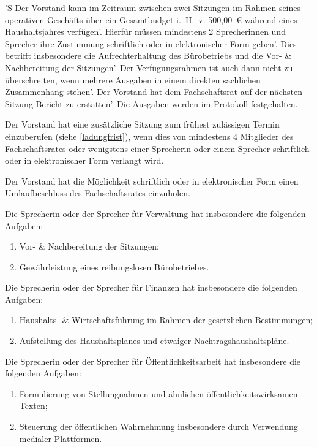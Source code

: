\documentclass[%
	parskip=half,
]{scrartcl}
\newcommand{\edit}[1]{{\color{red} #1}}
\newcommand{\add}[1]{{\color{blue} #1}}
\begin{document}
\begin{contract}
'S \edit{Der Vorstand kann} im Zeitraum zwischen zwei Sitzungen im Rahmen \edit{seines} operativen Geschäfts
über ein Gesamtbudget i.~H.~v. \edit{500,00}~€ \add{während eines Haushaltsjahres} verfügen'. Hierfür müssen mindestens
2 \edit{Sprecherinnen und Sprecher} ihre Zustimmung schriftlich oder in elektronischer Form geben'. Dies betrifft
insbesondere die Aufrechterhaltung des Bürobetriebs und die Vor- \& Nachbereitung der Sitzungen'. Der Verfügungsrahmen
ist auch dann nicht zu überschreiten, wenn mehrere Ausgaben in einem direkten sachlichen Zusammenhang stehen'. 
\edit{Der Vorstand hat} dem Fachschaftsrat auf der nächsten Sitzung Bericht zu erstatten'. Die Ausgaben
werden im Protokoll festgehalten.

\edit{Der Vorstand hat} eine zusätzliche Sitzung zum frühest zulässigen Termin einzuberufen \add{(siehe 
\ref{ladungfrist})}, wenn dies von mindestens 4 Mitglieder des Fachschaftsrates oder \edit{wenigstens einer Sprecherin 
oder einem Sprecher} schriftlich oder in elektronischer Form verlangt wird.

\edit{Der Vorstand hat} die Möglichkeit schriftlich oder in elektronischer Form einen Umlaufbeschluss des 
Fachschaftsrates einzuholen.

\edit{Die Sprecherin oder der Sprecher} für Verwaltung hat insbesondere die folgenden Aufgaben:
\begin{enumerate}[\qquad a)]
	\item Vor- \& Nachbereitung der Sitzungen;
	\item Gewährleistung eines reibungslosen Bürobetriebes.
\end{enumerate}

\edit{Die Sprecherin oder der Sprecher} für Finanzen hat insbesondere die folgenden Aufgaben:
\begin{enumerate}[\qquad a)]
	\item Haushalts- \& Wirtschaftsführung im Rahmen der gesetzlichen Bestimmungen;
	\item Aufstellung des Haushaltsplanes und etwaiger Nachtragshaushaltspläne.
\end{enumerate}

\add{Die Sprecherin oder der Sprecher für Öffentlichkeitsarbeit hat insbesondere die folgenden Aufgaben:
\begin{enumerate}[\qquad a)]
	\item Formulierung von Stellungnahmen und ähnlichen öffentlichkeitswirksamen Texten;
	\item Steuerung der öffentlichen Wahrnehmung insbesondere durch Verwendung medialer Plattformen.
\end{enumerate}}

\end{contract}
\end{document}
